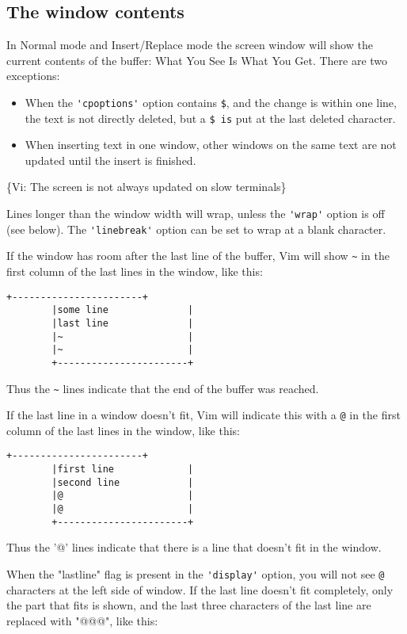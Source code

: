\subsection{The window contents}
\label{window-contents}
In Normal mode and Insert/Replace mode the screen window will show the current contents of the buffer: What You See Is What You Get.
There are two exceptions:
\begin{itemize}
				\item When the \verb!'cpoptions'! option contains \verb!$!,  and the change is within one line, the text is not directly deleted, but a \verb!$ is! put at the last deleted character.
				\item When inserting text in one window, other windows on the same text are not updated until the insert is finished.
\end{itemize}
\{Vi: The screen is not always updated on slow terminals\}

Lines longer than the window width will wrap, unless the \verb!'wrap'! option is off (see below).
The \verb!'linebreak'! option can be set to wrap at a blank character.

If the window has room after the last line of the buffer, Vim will show \verb!~! in the first column of the last lines in the window, like this:
\begin{Verbatim}[samepage=true]
		+-----------------------+
		|some line              |
		|last line              |
		|~                      |
		|~                      |
		+-----------------------+
\end{Verbatim}

Thus the \verb!~! lines indicate that the end of the buffer was reached.

If the last line in a window doesn't fit, Vim will indicate this with a \verb'@' in the first column of the last lines in the window, like this:

\begin{Verbatim}[samepage=true]
		+-----------------------+
		|first line             |
		|second line            |
		|@                      |
		|@                      |
		+-----------------------+
\end{Verbatim}

Thus the '@' lines indicate that there is a line that doesn't fit in the window.

When the "lastline" flag is present in the \verb!'display'! option, you will not see \verb'@' characters at the left side of window.
If the last line doesn't fit completely, only the part that fits is shown, and the last three characters of the last line are replaced with "@@@", like this:


